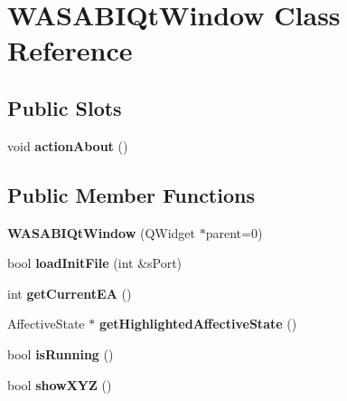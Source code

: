 \hypertarget{class_w_a_s_a_b_i_qt_window}{
\section{\-W\-A\-S\-A\-B\-I\-Qt\-Window \-Class \-Reference}
\label{class_w_a_s_a_b_i_qt_window}
}
\subsection*{\-Public \-Slots}
\begin{DoxyCompactItemize}
\item 
\hypertarget{class_w_a_s_a_b_i_qt_window_a1fb4a1cf3c8b1234a43eeedb27f07467}{
void {\bfseries action\-About} ()}
\label{class_w_a_s_a_b_i_qt_window_a1fb4a1cf3c8b1234a43eeedb27f07467}

\end{DoxyCompactItemize}
\subsection*{\-Public \-Member \-Functions}
\begin{DoxyCompactItemize}
\item 
\hypertarget{class_w_a_s_a_b_i_qt_window_a121e033a12769033e9d0b14d55b82bf6}{
{\bfseries \-W\-A\-S\-A\-B\-I\-Qt\-Window} (\-Q\-Widget $\ast$parent=0)}
\label{class_w_a_s_a_b_i_qt_window_a121e033a12769033e9d0b14d55b82bf6}

\item 
\hypertarget{class_w_a_s_a_b_i_qt_window_a149f37148a177335af2dd8dc589256a0}{
bool {\bfseries load\-Init\-File} (int \&s\-Port)}
\label{class_w_a_s_a_b_i_qt_window_a149f37148a177335af2dd8dc589256a0}

\item 
\hypertarget{class_w_a_s_a_b_i_qt_window_a500bdf47e5f1c30f6b3b5c07ca8a5451}{
int {\bfseries get\-Current\-E\-A} ()}
\label{class_w_a_s_a_b_i_qt_window_a500bdf47e5f1c30f6b3b5c07ca8a5451}

\item 
\hypertarget{class_w_a_s_a_b_i_qt_window_a85b1c1ed9f218dfb5208ec8eac0a462e}{
\-Affective\-State $\ast$ {\bfseries get\-Highlighted\-Affective\-State} ()}
\label{class_w_a_s_a_b_i_qt_window_a85b1c1ed9f218dfb5208ec8eac0a462e}

\item 
\hypertarget{class_w_a_s_a_b_i_qt_window_a28b9e274244551189d8bdc89360fc6bd}{
bool {\bfseries is\-Running} ()}
\label{class_w_a_s_a_b_i_qt_window_a28b9e274244551189d8bdc89360fc6bd}

\item 
\hypertarget{class_w_a_s_a_b_i_qt_window_af79fb22920334796554b224bb2705078}{
bool {\bfseries show\-X\-Y\-Z} ()}
\label{class_w_a_s_a_b_i_qt_window_af79fb22920334796554b224bb2705078}

\end{DoxyCompactItemize}
